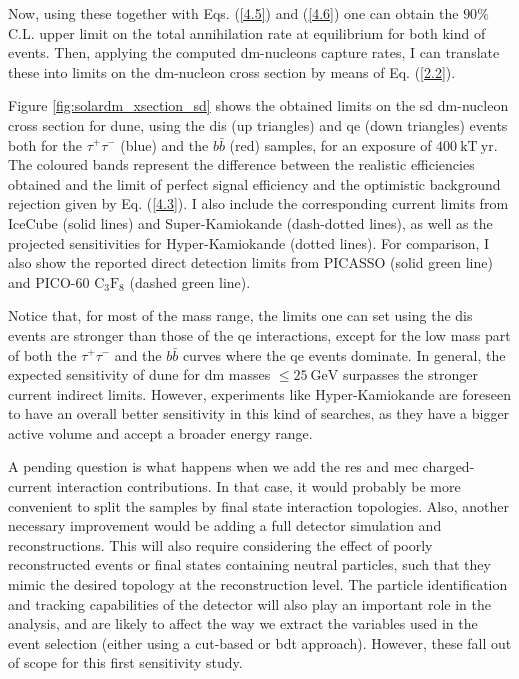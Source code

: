 Now, using these together with Eqs. (\ref{4.5}) and (\ref{4.6}) one can obtain the $90\%$ C.L. upper limit on the total annihilation rate at equilibrium for both kind of events. Then, applying the computed \gls{dm}-nucleons capture rates, I can translate these into limits on the \gls{dm}-nucleon cross section by means of Eq. (\ref{2.2}).

Figure \ref{fig:solardm_xsection_sd} shows the obtained limits on the \gls{sd} \gls{dm}-nucleon cross section for \gls{dune}, using the \gls{dis} (up triangles) and \gls{qe} (down triangles) events both for the $\tau^{+}\tau^{-}$ (blue) and the $b\bar{b}$ (red) samples, for an exposure of $400 \ \mathrm{kT} \ \mathrm{yr}$. The coloured bands represent the difference between the realistic efficiencies obtained and the limit of perfect signal efficiency and the optimistic background rejection given by Eq. (\ref{4.3}). I also include the corresponding current limits from IceCube \cite{IceCube2021} (solid lines) and Super-Kamiokande \cite{Super-Kamiokande2015} (dash-dotted lines), as well as the projected sensitivities for Hyper-Kamiokande \cite{Bell2021} (dotted lines). For comparison, I also show the reported direct detection limits from PICASSO \cite{Behnke2016} (solid green line) and PICO-60 $\mathrm{C}_{3}\mathrm{F}_{8}$ \cite{PICO2019} (dashed green line).

Notice that, for most of the mass range, the limits one can set using the \gls{dis} events are stronger than those of the \gls{qe} interactions, except for the low mass part of both the $\tau^{+}\tau^{-}$ and the $b\bar{b}$ curves where the \gls{qe} events dominate. In general, the expected sensitivity of \gls{dune} for \gls{dm} masses $\leq 25 ~ \mathrm{GeV}$ surpasses the stronger current indirect limits. However, experiments like Hyper-Kamiokande are foreseen to have an overall better sensitivity in this kind of searches, as they have a bigger active volume and accept a broader energy range.

A pending question is what happens when we add the \gls{res} and \gls{mec} charged-current interaction contributions. In that case, it would probably be more convenient to split the samples by final state interaction topologies. Also, another necessary improvement would be adding a full detector simulation and reconstructions. This will also require considering the effect of poorly reconstructed events or final states containing neutral particles, such that they mimic the desired topology at the reconstruction level. The particle identification and tracking capabilities of the detector will also play an important role in the analysis, and are likely to affect the way we extract the variables used in the event selection (either using a cut-based or \gls{bdt} approach). However, these fall out of scope for this first sensitivity study.

